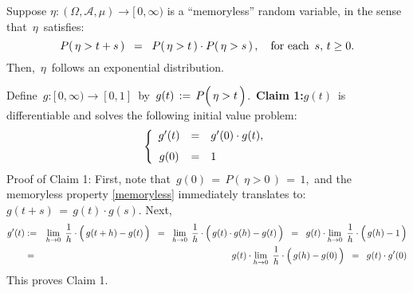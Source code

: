 
\begin{theorem}
\mbox{}
\vskip 0.2cm
\noindent
Suppose $\eta : (\Omega,\mathcal{A},\mu) \longrightarrow [\,0,\infty)$
is a ``memoryless'' random variable, in the sense that \,$\eta$\, satisfies:
\begin{equation}\label{memoryless}
P\!\left(\,\eta > t + s\,\right) \;\; = \;\; P\!\left(\,\eta > t \,\right) \cdot P\!\left(\,\eta > s\,\right),
\quad
\textnormal{for each \,$s,\, t \geq 0$}.
\end{equation}
Then, \,$\eta$\, follows an exponential distribution.
\end{theorem}
\proof
Define \,$g : [\,0,\infty) \longrightarrow [0,1]$\, by
\,$g(t) \, := \, P\!\left(\,\eta \overset{{\color{white}.}}{>} t\,\right)$.\,
\vskip 0.5cm
\noindent
\textbf{Claim 1:}\quad $g(t)$\, is differentiable and solves the following initial value problem:
\begin{equation}\label{IVP:exponential}
\left\{\begin{array}{ccl}
g^{\prime}(t) & = & g^{\prime}(0) \cdot g(t),
\\
\overset{{\color{white}1}}{g(0)} & = & 1
\end{array}\right.
\end{equation}
\vskip 0.2cm
\noindent
Proof of Claim 1:\quad
First, note that \,$g(0) \,=\, P(\,\eta > 0\,) \,=\, 1$,\,
and the memoryless property \eqref{memoryless} immediately translates to:
\,$g(t+s) \,=\, g(t) \cdot g(s)$.
Next,
\begin{eqnarray*}
g^{\prime}(t)
& := &
	\underset{h \rightarrow 0}{\lim}\;\,
	\dfrac{1}{h}\cdot\left(\,g(t+h) \overset{{\color{white}.}}{-} g(t)\,\right)
\;\; = \;\;
	\underset{h \rightarrow 0}{\lim}\;\,
	\dfrac{1}{h}\cdot\left(\,g(t) \cdot g(h) \overset{{\color{white}.}}{-} g(t)\,\right)
\;\; = \;\;
	g(t) \cdot
	\underset{h \rightarrow 0}{\lim}\;\,
	\dfrac{1}{h}\cdot\left(\,g(h) \overset{{\color{white}.}}{-} 1\,\right)
\\
& = &
	g(t) \cdot
	\underset{h \rightarrow 0}{\lim}\;\,
	\dfrac{1}{h}\cdot\left(\,g(h) \overset{{\color{white}.}}{-} g(0)\,\right)
\;\; = \;\;
	g(t) \cdot g^{\prime}(0)
\end{eqnarray*}
This proves Claim 1.

